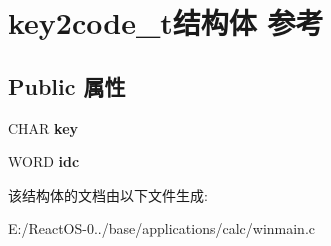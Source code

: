 \hypertarget{structkey2code__t}{}\section{key2code\+\_\+t结构体 参考}
\label{structkey2code__t}
\subsection*{Public 属性}
\begin{DoxyCompactItemize}
\item 
\mbox{\label{structkey2code__t_a47f6a70a69046780a184704dd9007d0e}} 
C\+H\+AR {\bfseries key}
\item 
\mbox{\label{structkey2code__t_a2b21f3c027d27d93f6ac79741562bcb3}} 
W\+O\+RD {\bfseries idc}
\end{DoxyCompactItemize}


该结构体的文档由以下文件生成\+:\begin{DoxyCompactItemize}
\item 
E\+:/\+React\+O\+S-\/0../base/applications/calc/winmain.\+c\end{DoxyCompactItemize}
